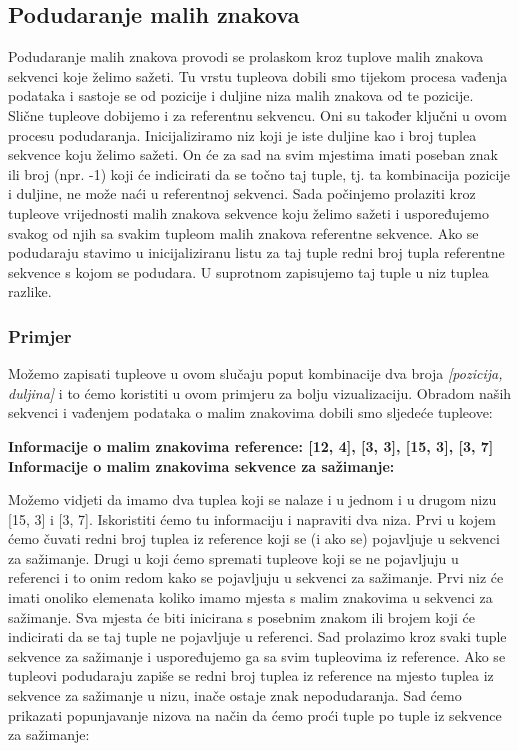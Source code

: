 \subsection{Podudaranje malih znakova}
Podudaranje malih znakova provodi se prolaskom kroz tuplove malih znakova sekvenci koje želimo sažeti. Tu vrstu tupleova dobili smo tijekom procesa vađenja podataka i sastoje se od pozicije i duljine niza malih znakova od te pozicije. Slične tupleove dobijemo i za referentnu sekvencu. Oni su također ključni u ovom procesu podudaranja. Inicijaliziramo niz koji je iste duljine kao i broj tuplea sekvence koju želimo sažeti. On će za sad na svim mjestima imati poseban znak ili broj (npr. -1) koji će indicirati da se točno taj tuple, tj. ta kombinacija pozicije i duljine, ne može naći u referentnoj sekvenci. Sada počinjemo prolaziti kroz tupleove vrijednosti malih znakova sekvence koju želimo sažeti i uspoređujemo svakog od njih sa svakim tupleom malih znakova referentne sekvence. Ako se podudaraju stavimo u inicijaliziranu listu za taj tuple redni broj tupla referentne sekvence s kojom se podudara. U suprotnom zapisujemo taj tuple u niz tuplea razlike. 

\subsubsection{Primjer}
Možemo zapisati tupleove u ovom slučaju poput kombinacije dva broja \textit{[pozicija, duljina]} i to ćemo koristiti u ovom primjeru za bolju vizualizaciju. 
Obradom naših sekvenci  i vađenjem podataka o malim znakovima dobili smo sljedeće tupleove:\newline

\begin{minipage}{10cm}
	\textbf{Informacije o malim znakovima reference:\newline
		 {[12, 4], [3, 3], [15,
			3], [3, 7]}\newline
		Informacije o malim znakovima sekvence za sažimanje: \newline {[12, 10],
			[15, 3], [3, 7]}
		\newline
		}
\end{minipage}

Možemo vidjeti da imamo dva tuplea koji se nalaze i u jednom i u drugom nizu [15, 3] i [3, 7]. Iskoristiti ćemo tu informaciju i napraviti dva niza. Prvi u kojem ćemo čuvati redni broj tuplea iz reference koji se (i ako se) pojavljuje u sekvenci za sažimanje. Drugi u koji ćemo spremati tupleove koji se ne pojavljuju u referenci i to onim redom kako se pojavljuju u sekvenci za sažimanje. Prvi niz će imati onoliko elemenata koliko imamo mjesta s malim znakovima u sekvenci za sažimanje. Sva mjesta će biti inicirana s posebnim znakom ili brojem koji će indicirati da se taj tuple ne pojavljuje u referenci. Sad prolazimo kroz svaki tuple sekvence za sažimanje i uspoređujemo ga sa svim tupleovima iz reference. Ako se tupleovi podudaraju zapiše se redni broj tuplea iz reference na mjesto tuplea iz sekvence za sažimanje u nizu, inače ostaje znak nepodudaranja. Sad ćemo prikazati popunjavanje nizova na način da ćemo proći tuple po tuple iz sekvence za sažimanje:\newline


